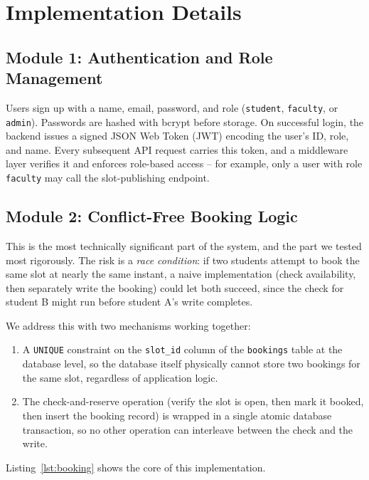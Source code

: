 \documentclass{tietreport}
\begin{document}
\section{Implementation Details}

\subsection{Module 1: Authentication and Role Management}

Users sign up with a name, email, password, and role
(\texttt{student}, \texttt{faculty}, or \texttt{admin}).
Passwords are hashed with bcrypt before storage. On
successful login, the backend issues a signed JSON Web
Token (JWT) encoding the user's ID, role, and name. Every
subsequent API request carries this token, and a
middleware layer verifies it and enforces role-based
access -- for example, only a user with role
\texttt{faculty} may call the slot-publishing endpoint.

\subsection{Module 2: Conflict-Free Booking Logic}
\label{sec:booking-logic}

This is the most technically significant part of the
system, and the part we tested most rigorously. The risk
is a \textit{race condition}: if two students attempt to
book the same slot at nearly the same instant, a naive
implementation (check availability, then separately write
the booking) could let both succeed, since the check for
student B might run before student A's write completes.

We address this with two mechanisms working together:

\begin{enumerate}
  \item A \texttt{UNIQUE} constraint on the
    \texttt{slot\_id} column of the \texttt{bookings}
    table at the database level, so the database itself
    physically cannot store two bookings for the same
    slot, regardless of application logic.
  \item The check-and-reserve operation (verify the slot
    is open, then mark it booked, then insert the booking
    record) is wrapped in a single atomic database
    transaction, so no other operation can interleave
    between the check and the write.
\end{enumerate}

Listing~\ref{lst:booking} shows the core of this
implementation.
\end{document}
